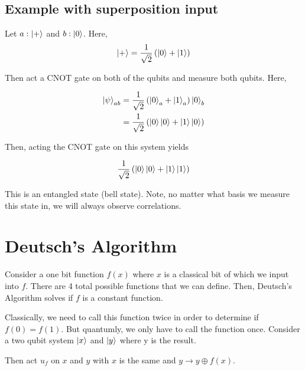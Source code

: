 \documentclass{article}
\newtheorem{one minute paper}[theorem]{One Minute Paper}
\begin{document}
\subsection*{Example with superposition input}

Let $a: \ket{+}$ and $b: \ket{0}$. Here, $$\ket{+} = \frac{1}{\sqrt{2}}\left( \ket{0} + \ket{1} \right)$$

Then act a CNOT gate on both of the qubits and measure both qubits. Here, 

\begin{align}
    \ket{\psi}_{ab} &= \frac{1}{\sqrt{2}}\left( \ket{0}_a + \ket{1}_a\right)\ket{0}_b \\
    &= \frac{1}{\sqrt{2}}\left( \ket{0}\ket{0} + \ket{1}\ket{0} \right)
\end{align}

Then, acting the CNOT gate on this system yields

\begin{equation}
    \frac{1}{\sqrt{2}}\left( \ket{0}\ket{0} + \ket{1}\ket{1} \right)
\end{equation}

This is an entangled state (bell state). Note, no matter what basis we measure this state in, we will always observe correlations. 

\section*{Deutsch's Algorithm}

Consider a one bit function $f(x)$ where $x$ is a classical bit of which we input into $f$. There are 4 total possible functions that we can define. 
Then, Deutsch's Algorithm solves if $f$ is a constant function. 

Classically, we need to call this function twice in order to determine if $f(0) = f(1)$. But quantumly, we only have to call the function once. Consider a two qubit system $\ket{x}$ and $\ket{y}$ where y is the result. 

Then act $u_f$ on $x$ and $y$ with $x$ is the same and $y \rightarrow y \oplus f(x)$. 
\end{document}
